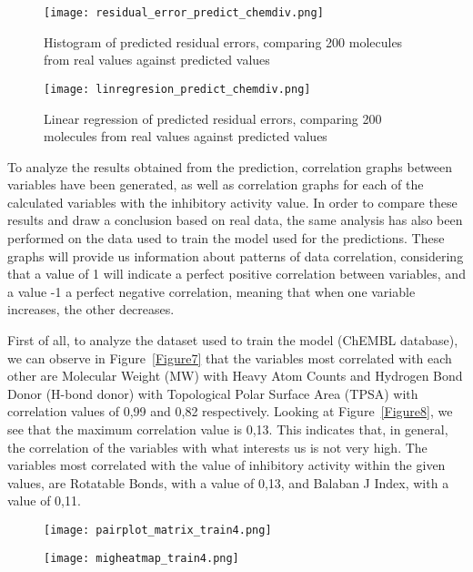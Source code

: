 \documentclass[final,times,twocolumn,article]{elsarticle}
\begin{document}
\begin{figure}[ht]
    \centering 
     \texttt{[image: residual\_error\_predict\_chemdiv.png]}	
     \caption{Histogram of predicted residual errors, comparing 200 molecules from real values against predicted values} 
     \label{Figure5}
 \end{figure}

 \begin{figure}[ht]
    \centering 
     \texttt{[image: linregresion\_predict\_chemdiv.png]}	
     \caption{Linear regression of predicted residual errors, comparing 200 molecules from real values against predicted values} 
     \label{Figure6}
 \end{figure}

 To analyze the results obtained from the prediction, correlation graphs between variables have been generated, as well as correlation graphs for each of the calculated variables with the inhibitory activity value. In order to compare these results and draw a conclusion based on real data, the same analysis has also been performed on the data used to train the model used for the predictions. These graphs will provide us information about patterns of data correlation, considering that a value of 1 will indicate a perfect positive correlation between variables, and a value -1 a perfect negative correlation, meaning that when one variable increases, the other decreases. 

 First of all, to analyze the dataset used to train the model (ChEMBL database), we can observe in Figure~\ref{Figure7} that the variables most correlated with each other are Molecular Weight (MW) with Heavy Atom Counts and Hydrogen Bond Donor (H-bond donor) with Topological Polar Surface Area (TPSA) with correlation values of 0,99 and 0,82 respectively. Looking at Figure~\ref{Figure8}, we see that the maximum correlation value is 0,13. This indicates that, in general, the correlation of the variables with what interests us is not very high. The variables most correlated with the value of inhibitory activity within the given values, are Rotatable Bonds, with a value of 0,13, and Balaban J Index, with a value of 0,11. 

\begin{figure*}
    \begin{subfigure}{0.6\textwidth}
        \texttt{[image: pairplot\_matrix\_train4.png]} 
        \caption{}%
    \end{subfigure}
    \hfill
    \begin{subfigure}{0.6\textwidth}
        \texttt{[image: migheatmap\_train4.png]}
        \caption{} %
    \end{subfigure}
    
    \caption{Correlation analysis from the dataset used to train the model (ChEMBL). (a) Pariplot correlation matrix. (b)Correlation matrix heatmap}
    \label{Figure7}
\end{figure*}
\end{document}
